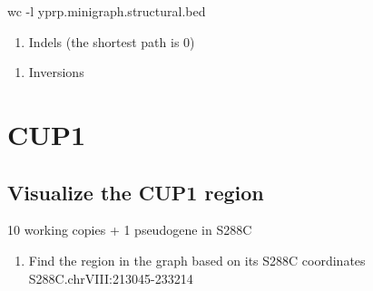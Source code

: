 \documentclass[
]{book}
\newenvironment{Shaded}{\begin{snugshade}}{\end{snugshade}}
\newcommand{\AttributeTok}[1]{\textcolor[rgb]{0.77,0.63,0.00}{#1}}
\newcommand{\ExtensionTok}[1]{#1}
\newcommand{\FunctionTok}[1]{\textcolor[rgb]{0.00,0.00,0.00}{#1}}
\newcommand{\KeywordTok}[1]{\textcolor[rgb]{0.13,0.29,0.53}{\textbf{#1}}}
\newcommand{\NormalTok}[1]{#1}
\newcommand{\StringTok}[1]{\textcolor[rgb]{0.31,0.60,0.02}{#1}}
\providecommand{\tightlist}{%
  \setlength{\itemsep}{0pt}\setlength{\parskip}{0pt}}
\begin{document}
\begin{Shaded}
\begin{Highlighting}[]
\FunctionTok{wc} \AttributeTok{{-}l}\NormalTok{ yprp.minigraph.structural.bed}
\end{Highlighting}
\end{Shaded}

\begin{enumerate}
\def\labelenumi{\arabic{enumi}.}
\setcounter{enumi}{1}
\tightlist
\item
  Indels (the shortest path is 0)
\end{enumerate}

\begin{Shaded}
\end{Shaded}

\begin{enumerate}
\def\labelenumi{\arabic{enumi}.}
\setcounter{enumi}{2}
\tightlist
\item
  Inversions
\end{enumerate}

\begin{Shaded}
\end{Shaded}

\hypertarget{cup1}{%
\section{CUP1}\label{cup1}}

\hypertarget{visualize-the-cup1-region}{%
\subsection*{Visualize the CUP1 region}\label{visualize-the-cup1-region}}

10 working copies + 1 pseudogene in S288C

\begin{enumerate}
\def\labelenumi{\arabic{enumi}.}
\tightlist
\item
  Find the region in the graph based on its S288C coordinates\\
  S288C.chrVIII:213045-233214
\end{enumerate}
\end{document}
